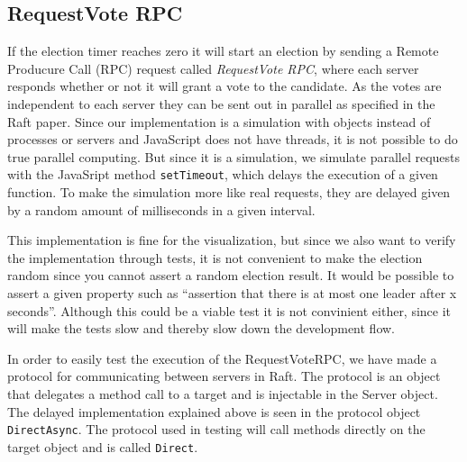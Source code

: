 
\subsection{RequestVote RPC} %
\label{sub:requestvote_rpc}

If the election timer reaches zero it will start an election by sending a Remote Producure Call (RPC) request called \emph{RequestVote RPC}, where each server responds whether or not it will grant a vote to the candidate. As the votes are independent to each server they can be sent out in parallel as specified in the Raft paper. Since our implementation is a simulation with objects instead of processes or servers and JavaScript does not have threads, it is not possible to do true parallel computing. But since it is a simulation, we simulate parallel requests with the JavaSript method \verb$setTimeout$, which delays the execution of a given function. To make the simulation more like real requests, they are delayed given by a random amount of milliseconds in a given interval.

This implementation is fine for the visualization, but since we also want to verify the implementation through tests, it is not convenient to make the election random since you cannot assert a random election result. It would be possible to assert a given property such as ``assertion that there is at most one leader after x seconds''. Although this could be a viable test it is not convinient either, since it will make the tests slow and thereby slow down the development flow.

In order to easily test the execution of the RequestVoteRPC, we have made a protocol for communicating between servers in Raft. The protocol is an object that delegates a method call to a target and is injectable in the Server object. The delayed implementation explained above is seen in the protocol object \verb$DirectAsync$. The protocol used in testing will call methods directly on the target object and is called \verb$Direct$.


%

